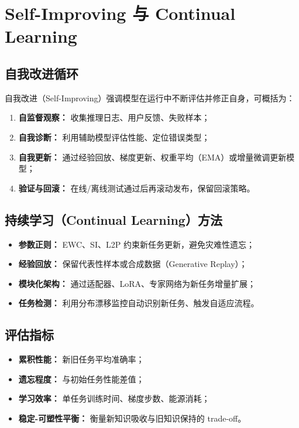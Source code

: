 \documentclass[UTF8,zihao=-4]{ctexart}
\begin{document}
\section{Self-Improving 与 Continual Learning}
\subsection{自我改进循环}
自我改进（Self-Improving）强调模型在运行中不断评估并修正自身，可概括为：
\begin{enumerate}
  \item \textbf{自监督观察：} 收集推理日志、用户反馈、失败样本；
  \item \textbf{自我诊断：} 利用辅助模型评估性能、定位错误类型；
  \item \textbf{自我更新：} 通过经验回放、梯度更新、权重平均（EMA）或增量微调更新模型；
  \item \textbf{验证与回滚：} 在线/离线测试通过后再滚动发布，保留回滚策略。
\end{enumerate}

\subsection{持续学习（Continual Learning）方法}
\begin{itemize}
  \item \textbf{参数正则：} EWC、SI、L2P 约束新任务更新，避免灾难性遗忘；
  \item \textbf{经验回放：} 保留代表性样本或合成数据（Generative Replay）；
  \item \textbf{模块化架构：} 通过适配器、LoRA、专家网络为新任务增量扩展；
  \item \textbf{任务检测：} 利用分布漂移监控自动识别新任务、触发自适应流程。
\end{itemize}

\subsection{评估指标}
\begin{itemize}
  \item \textbf{累积性能：} 新旧任务平均准确率；
  \item \textbf{遗忘程度：} 与初始任务性能差值；
  \item \textbf{学习效率：} 单任务训练时间、梯度步数、能源消耗；
  \item \textbf{稳定-可塑性平衡：} 衡量新知识吸收与旧知识保持的 trade-off。
\end{itemize}
\end{document}
